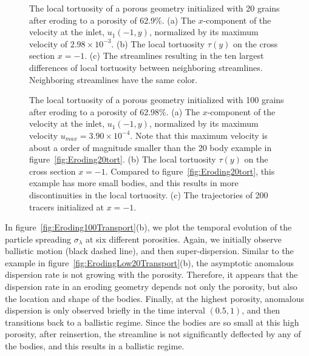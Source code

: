 \documentclass{jfm}
\begin{document}
\begin{figure}
\caption{\label{fig:Eroding20tort} The local tortuosity of a porous
geometry initialized with 20 grains after eroding to a porosity of
62.9\%.  (a) The $x$-component of the velocity at the inlet,
$u_1(-1,y)$, normalized by its maximum velocity of $2.98 \times
10^{-3}$. (b) The local tortuosity $\tau(y)$ on the cross section $x =
-1$. (c) The streamlines resulting in the ten largest differences of
local tortuosity between neighboring streamlines.  Neighboring
streamlines have the same color.}


\caption{\label{fig:Eroding100tort} The local tortuosity of a porous
geometry initialized with 100 grains after eroding to a porosity of
62.98\%.  (a) The $x$-component of the velocity at the inlet, $u_1(-1,
y)$, normalized by its maximum velocity $u_{max}=3.90 \times 10^{-4}$.
Note that this maximum velocity is about a order of magnitude smaller
than the 20 body example in figure~\ref{fig:Eroding20tort}.  (b) The
local tortuosity $\tau(y)$ on the cross section $x = -1$. Compared to
figure~\ref{fig:Eroding20tort}, this example has more small bodies, and
this results in more discontinuities in the local tortuosity.  (c) The
trajectories of 200 tracers initialized at $x = -1$.}
\end{figure}

In figure~\ref{fig:Eroding100Transport}(b), we plot the temporal
evolution of the particle spreading $\sigma_\lambda$ at six different
porosities. Again, we initially observe ballistic motion (black dashed
line), and then super-dispersion.  Similar to the example in
figure~\ref{fig:ErodingLow20Transport}(b), the asymptotic anomalous
dispersion rate is not growing with the porosity.  Therefore, it appears
that the dispersion rate in an eroding geometry depends not only the
porosity, but also the location and shape of the bodies.  Finally, at
the highest porosity, anomalous dispersion is only observed briefly in
the time interval $(0.5,1)$, and then transitions back to a ballistic
regime.  Since the bodies are so small at this high porosity, after
reinsertion, the streamline is not significantly deflected by any of the
bodies, and this results in a ballistic regime.
\end{document}
